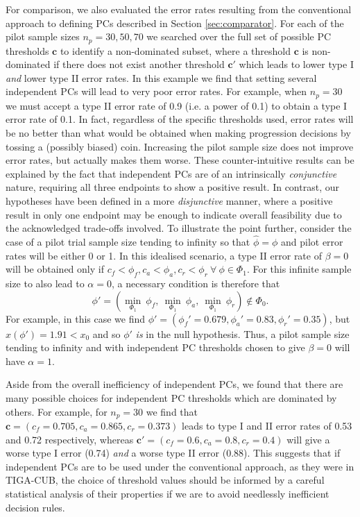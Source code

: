 \documentclass{article}
\begin{document}
For comparison, we also evaluated the error rates resulting from the conventional approach to defining PCs described in Section \ref{sec:comparator}. For each of the pilot sample sizes $n_p = 30, 50, 70$ we searched over the full set of possible PC thresholds $\mathbf{c}$ to identify a non-dominated subset, where a threshold $\mathbf{c}$ is non-dominated if there does not exist another threshold $\mathbf{c}'$ which leads to lower type I \emph{and} lower type II error rates. In this example we find that setting several independent PCs will lead to very poor error rates. For example, when $n_p = 30$  we must accept a type II error rate of 0.9 (i.e. a power of 0.1) to obtain a type I error rate of 0.1. In fact, regardless of the specific thresholds used, error rates will be no better than what would be obtained when making progression decisions by tossing a (possibly biased) coin. Increasing the pilot sample size does not improve error rates, but actually makes them worse. These counter-intuitive results can be explained by the fact that independent PCs are of an intrinsically \emph{conjunctive} nature, requiring all three endpoints to show a positive result. In contrast, our hypotheses have been defined in a more \emph{disjunctive} manner, where a positive result in only one endpoint may be enough to indicate overall feasibility due to the acknowledged trade-offs involved. To illustrate the point further, consider the case of a  pilot trial sample size tending to infinity so that $\hat{\phi} = \phi$ and pilot error rates will be either 0 or 1. In this idealised scenario, a type II error rate of $\beta = 0$ will be obtained only if $c_f < \phi_f, c_a < \phi_a, c_r < \phi_r ~ \forall ~ \phi \in \Phi_1$. For this infinite sample size to also lead to $\alpha = 0$, a necessary condition is therefore that
$$
\phi' = \left( \min_{\Phi_1} ~ \phi_f, ~ \min_{\Phi_1} ~ \phi_a, ~ \min_{\Phi_1} ~ \phi_r \right) \not\in \Phi_0.
$$ 
For example, in this case we find $\phi' = (\phi_f'=0.679, \phi_a'=0.83, \phi_r'=0.35)$, but $x(\phi') = 1.91 < x_0$ and so $\phi'$ \emph{is} in the null hypothesis. Thus, a pilot sample size tending to infinity and with independent PC thresholds chosen to give $\beta = 0$ will have $\alpha = 1$.

Aside from the overall inefficiency of independent PCs, we found that there are many possible choices for independent PC thresholds which are dominated by others. For example, for $n_p = 30$ we find that $\mathbf{c} = (c_f=0.705, c_a=0.865, c_r=0.373)$ leads to type I and II error rates of 0.53 and 0.72 respectively, whereas $\mathbf{c}' = (c_f=0.6, c_a=0.8, c_r=0.4)$ will give a worse type I error (0.74) \emph{and} a worse type II error (0.88). This suggests that if independent PCs are to be used under the conventional approach, as they were in TIGA-CUB, the choice of threshold values should be informed by a careful statistical analysis of their properties if we are to avoid needlessly inefficient decision rules. 
\end{document}
